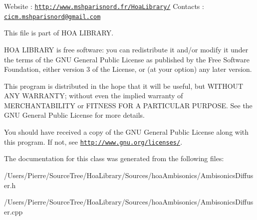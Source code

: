 Website \-: \href{http://www.mshparisnord.fr/HoaLibrary/}{\tt http\-://www.\-mshparisnord.\-fr/\-Hoa\-Library/} Contacts \-: \href{mailto:cicm.mshparisnord@gmail.com}{\tt cicm.\-mshparisnord@gmail.\-com}

This file is part of H\-O\-A L\-I\-B\-R\-A\-R\-Y.

H\-O\-A L\-I\-B\-R\-A\-R\-Y is free software\-: you can redistribute it and/or modify it under the terms of the G\-N\-U General Public License as published by the Free Software Foundation, either version 3 of the License, or (at your option) any later version.

This program is distributed in the hope that it will be useful, but W\-I\-T\-H\-O\-U\-T A\-N\-Y W\-A\-R\-R\-A\-N\-T\-Y; without even the implied warranty of M\-E\-R\-C\-H\-A\-N\-T\-A\-B\-I\-L\-I\-T\-Y or F\-I\-T\-N\-E\-S\-S F\-O\-R A P\-A\-R\-T\-I\-C\-U\-L\-A\-R P\-U\-R\-P\-O\-S\-E. See the G\-N\-U General Public License for more details.

You should have received a copy of the G\-N\-U General Public License along with this program. If not, see \href{http://www.gnu.org/licenses/}{\tt http\-://www.\-gnu.\-org/licenses/}. 

The documentation for this class was generated from the following files\-:\begin{DoxyCompactItemize}
\item 
/\-Users/\-Pierre/\-Source\-Tree/\-Hoa\-Library/\-Sources/hoa\-Ambisonics/Ambisonics\-Diffuser.\-h\item 
/\-Users/\-Pierre/\-Source\-Tree/\-Hoa\-Library/\-Sources/hoa\-Ambisonics/Ambisonics\-Diffuser.\-cpp\end{DoxyCompactItemize}
